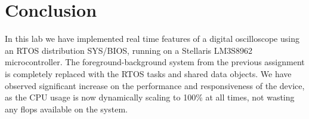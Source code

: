 \documentclass[12pt,oneside,letterpaper]{article}
\begin{document}
\section{Conclusion}
In this lab we have implemented real time features of a digital oscilloscope using an RTOS distribution SYS/BIOS, running on a Stellaris LM3S8962 microcontroller. The foreground-background system from the previous assignment is completely replaced with the RTOS tasks and shared data objects. We have observed significant increase on the performance and responsiveness of the device, as the CPU usage is now dynamically scaling to 100\% at all times, not wasting any flops available on the system.
\end{document}
